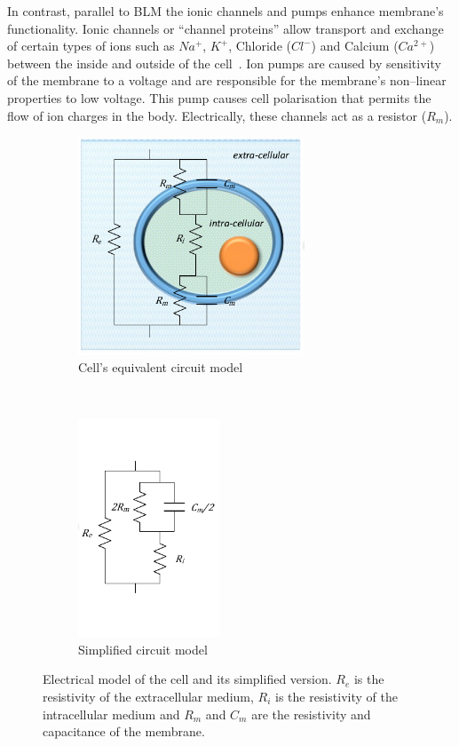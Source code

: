 In contrast, parallel to BLM the ionic channels and pumps enhance membrane’s functionality. Ionic channels or “channel proteins” allow transport and exchange of certain types of ions such as $Na^{+}$, $K^{+}$, Chloride ($Cl^{-}$) and Calcium ($Ca^{2+}$) between the inside and outside of the cell~\cite{lvovich2012impedance}. Ion pumps are caused by sensitivity of the membrane to a voltage and are responsible for the membrane’s non–linear properties to low voltage. This pump causes cell polarisation that permits the flow of ion charges in the body. Electrically, these channels act as a resistor ($R_m$).

\begin{figure}[!htbp]
	\centering
	\begin{subfigure}[t]{0.48\textwidth}
		\centering
		\includegraphics[height=6.5cm]{figure2a}
		\caption{Cell's equivalent circuit model}
		\label{fig:cell model}
	\end{subfigure}%
	~ 
	\begin{subfigure}[t]{0.48\textwidth}
		\centering
		\includegraphics[height=6.5cm]{figure2b}
		\caption{Simplified circuit model}
		\label{fig:cell simp model}
	\end{subfigure}
	\caption[Electrical model of the cell]{Electrical model of the cell and its simplified version. $R_e$ is the resistivity of the extracellular medium, $R_i$ is the resistivity of the intracellular medium and $R_m$ and $C_m$ are the resistivity and capacitance of the membrane.}
	\label{fig:cell models}
\end{figure}

